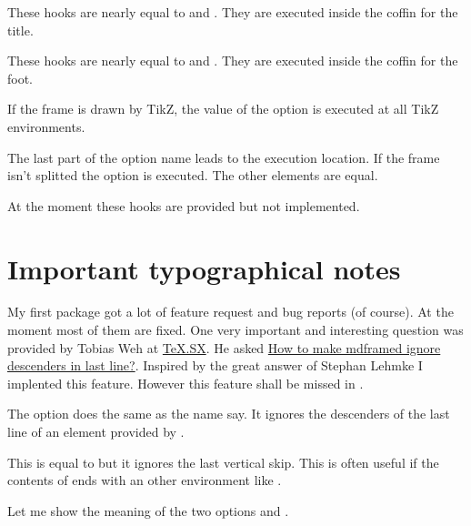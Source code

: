 \documentclass[openany,12pt,tocdepth=3]{ltx-md}
\begin{document}
These hooks are nearly equal to  and .
They are executed inside the coffin for the title.

These hooks are nearly equal to  and .
They are executed inside the coffin for the foot.


If the frame is drawn by TikZ, the value of the 
option  is executed at all
TikZ environments. 

The last part of the option name leads to the execution location.
If the frame isn't splitted the option  is executed. The
other elements are equal.

At the moment these hooks are provided but not implemented.



\section{Important typographical notes}
My first package  got a lot of feature request and
bug reports (of course). At the moment most of them are fixed. 
One very important and interesting question was provided by
Tobias Weh at \href{http://tex.stackexchange.com/}{TeX.SX}. He asked
\href{http://tex.stackexchange.com/questions/47584/how-to-make-mdframed-ignore-descenders-in-last-line}%
{How to make mdframed ignore descenders in last line?}. Inspired by
the great answer of Stephan Lehmke I implented this feature. 
However this feature shall be missed in .

The option  does the same as
the name say. It ignores the descenders of the last
line of an element provided by .

This is equal to  but it ignores the
last vertical skip. This is often useful if the contents
of  ends with an other environment
like . 


\clearpage
{}
Let me show the meaning of the two options 
and .
\end{document}
